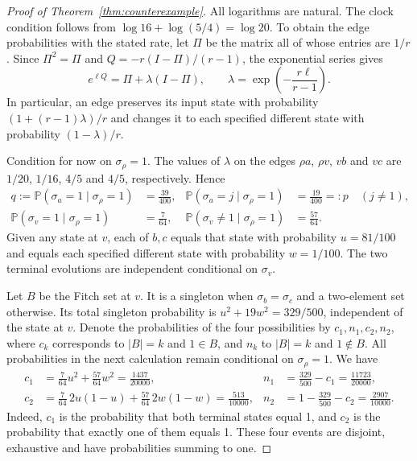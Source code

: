 \documentclass[11pt]{article}
\newcommand{\Prob}{\mathbb P}
\begin{document}
\begin{proof}[Proof of Theorem~\ref{thm:counterexample}]
All logarithms are natural. The clock condition follows from
$\log16+\log(5/4)=\log20$. To obtain the edge probabilities with the stated rate,
let $\Pi$ be the matrix all of whose entries are $1/r$. Since $\Pi^2=\Pi$ and
$Q=-r(I-\Pi)/(r-1)$, the exponential series gives
\begin{equation}\label{eq:channel}
 e^{\ell Q}=\Pi+\lambda(I-\Pi),\qquad
 \lambda=\exp\!\left(-\frac{r\ell}{r-1}\right).
\end{equation}
In particular, an edge preserves its input state with probability
$(1+(r-1)\lambda)/r$ and changes it to each specified different state with
probability $(1-\lambda)/r$.

Condition for now on $\sigma_\rho=1$. The values of $\lambda$ on the edges
$\rho a$, $\rho v$, $vb$ and $vc$ are $1/20$, $1/16$, $4/5$ and $4/5$,
respectively. Hence
\begin{equation}\label{eq:primitive}
 \begin{aligned}
 q:=\Prob(\sigma_a=1\mid\sigma_\rho=1)&=\frac{39}{400},&
 \Prob(\sigma_a=j\mid\sigma_\rho=1)&=\frac{19}{400}=:p\quad(j\ne1),\\
 \Prob(\sigma_v=1\mid\sigma_\rho=1)&=\frac7{64},&
 \Prob(\sigma_v\ne1\mid\sigma_\rho=1)&=\frac{57}{64}.
 \end{aligned}
\end{equation}
Given any state at $v$, each of $b,c$ equals that state with probability
$u=81/100$ and equals each specified different state with probability
$w=1/100$. The two terminal evolutions are independent conditional on
$\sigma_v$.

Let $B$ be the Fitch set at $v$. It is a singleton when $\sigma_b=\sigma_c$
and a two-element set otherwise. Its total singleton probability is
$u^2+19w^2=329/500$, independent of the state at $v$. Denote the probabilities
of the four possibilities by $c_1,n_1,c_2,n_2$, where $c_k$ corresponds to
$|B|=k$ and $1\in B$, and $n_k$ to $|B|=k$ and $1\notin B$. All probabilities
in the next calculation remain conditional on $\sigma_\rho=1$. We have
\begin{equation}\label{eq:cherry}
 \begin{aligned}
 c_1&=\frac7{64}u^2+\frac{57}{64}w^2=\frac{1437}{20000},&
 n_1&=\frac{329}{500}-c_1=\frac{11723}{20000},\\
 c_2&=\frac7{64}\,2u(1-u)+\frac{57}{64}\,2w(1-w)
       =\frac{513}{10000},&
 n_2&=1-\frac{329}{500}-c_2=\frac{2907}{10000}.
 \end{aligned}
\end{equation}
Indeed, $c_1$ is the probability that both terminal states equal 1, and $c_2$
is the probability that exactly one of them equals 1. These four events are
disjoint, exhaustive and have probabilities summing to one.


\end{proof}
\end{document}
